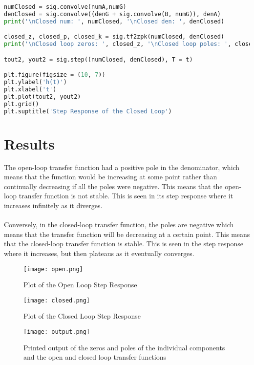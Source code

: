\documentclass[12pt]{report}
\begin{document}
\begin{lstlisting}[language=Python, caption=sig.residue() of the second differential equation]
numClosed = sig.convolve(numA,numG)
denClosed = sig.convolve((denG + sig.convolve(B, numG)), denA)
print('\nClosed num: ', numClosed, '\nClosed den: ', denClosed)

closed_z, closed_p, closed_k = sig.tf2zpk(numClosed, denClosed)
print('\nClosed loop zeros: ', closed_z, '\nClosed loop poles: ', closed_p)

tout2, yout2 = sig.step((numClosed, denClosed), T = t)

plt.figure(figsize = (10, 7))
plt.ylabel('h(t)')
plt.xlabel('t')
plt.plot(tout2, yout2)
plt.grid()
plt.suptitle('Step Response of the Closed Loop')
\end{lstlisting}



\section{Results}
The open-loop transfer function had a positive pole in the denominator, which means that the function would be increasing at some point rather than continually decreasing if all the poles were negative. This means that the open-loop transfer function is not stable. This is seen in its step response where it increases infinitely as it diverges. \\ \\
Conversely, in the closed-loop transfer function, the poles are negative which means that the transfer function will be decreasing at a certain point. This means that the closed-loop transfer function is stable. This is seen in the step response where it increases, but then plateaus as it eventually converges.
\begin{figure}[htp]
    \centering
    \texttt{[image: open.png]}
    \caption{Plot of the Open Loop Step Response}
\end{figure}

\begin{figure}[htp]
    \centering
    \texttt{[image: closed.png]}
    \caption{Plot of the Closed Loop Step Response}
\end{figure}

\begin{figure}[htp]
    \centering
    \texttt{[image: output.png]}
    \caption{Printed output of the zeros and poles of the individual components and the open and closed loop transfer functions}
\end{figure}
\end{document}
